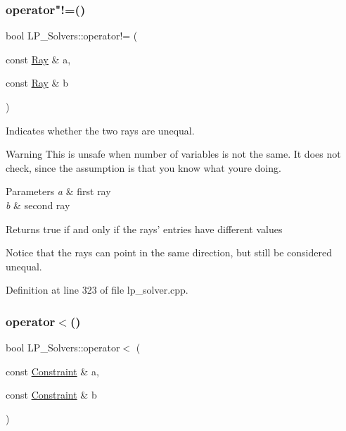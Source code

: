 \subsubsection{\texorpdfstring{operator"!=()}{operator!=()}\hspace{0.1cm}{\footnotesize\ttfamily [2/2]}}
{\footnotesize\ttfamily bool L\+P\+\_\+\+Solvers\+::operator!= (\begin{DoxyParamCaption}\item[{const \hyperlink{group___c_l_s_solvers_class_l_p___solvers_1_1_ray}{Ray} \&}]{a,  }\item[{const \hyperlink{group___c_l_s_solvers_class_l_p___solvers_1_1_ray}{Ray} \&}]{b }\end{DoxyParamCaption})}



Indicates whether the two rays are unequal. 

\begin{DoxyWarning}{Warning}
This is unsafe when number of variables is not the same. It does not check, since the assumption is that you know what you\textquotesingle{}re doing. 
\end{DoxyWarning}

\begin{DoxyParams}{Parameters}
{\em a} & first ray \\
\hline
{\em b} & second ray \\
\hline
\end{DoxyParams}
\begin{DoxyReturn}{Returns}
{\ttfamily true} if and only if the rays' entries have different values
\end{DoxyReturn}
Notice that the rays can point in the same direction, but still be considered unequal. 

Definition at line 323 of file lp\+\_\+solver.\+cpp.

\mbox{\label{namespace_l_p___solvers_a28f6cde3df8ed19a4195584ace43c9d9}} 
\subsubsection{\texorpdfstring{operator$<$()}{operator<()}\hspace{0.1cm}{\footnotesize\ttfamily [1/3]}}
{\footnotesize\ttfamily bool L\+P\+\_\+\+Solvers\+::operator$<$ (\begin{DoxyParamCaption}\item[{const \hyperlink{group___c_l_s_solvers_class_l_p___solvers_1_1_constraint}{Constraint} \&}]{a,  }\item[{const \hyperlink{group___c_l_s_solvers_class_l_p___solvers_1_1_constraint}{Constraint} \&}]{b }\end{DoxyParamCaption})}



